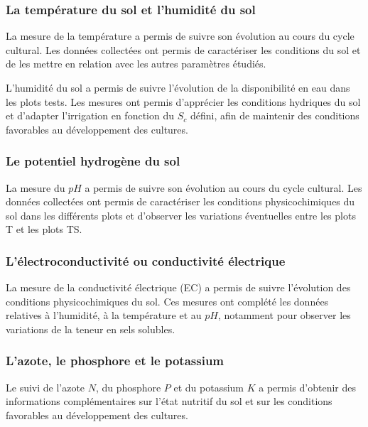 \subsubsection{La température du sol et l'humidité du sol}
La mesure de la température a permis de suivre son évolution au cours du cycle cultural. Les données collectées ont permis de caractériser les conditions du sol et de les mettre en relation avec les autres paramètres étudiés.

L’humidité du sol a permis de suivre l’évolution de la disponibilité en eau dans les plots tests. Les mesures ont permis d’apprécier les conditions hydriques du sol et d’adapter l’irrigation en fonction du $S_c$ défini, afin de maintenir des conditions favorables au développement des cultures.

\subsubsection{ Le  potentiel hydrogène du sol}
La mesure du $pH$ a permis de suivre son évolution au cours du cycle cultural. Les données collectées ont permis de caractériser les conditions physicochimiques du sol dans les différents plots et d’observer les variations éventuelles entre les plots T et les plots TS.

\subsubsection{L'électroconductivité ou conductivité électrique}
La mesure de la conductivité électrique (EC) a permis de suivre l’évolution des conditions physicochimiques du sol. Ces mesures ont complété les données relatives à l’humidité, à la température et au $pH$, notamment pour observer les variations de la teneur en sels solubles.

\subsubsection{L'azote, le phosphore et le potassium}
Le suivi de l’azote $N$, du phosphore $P$ et du potassium $K$ a permis d’obtenir des informations complémentaires sur l’état nutritif du sol et sur les conditions favorables au développement des cultures.
